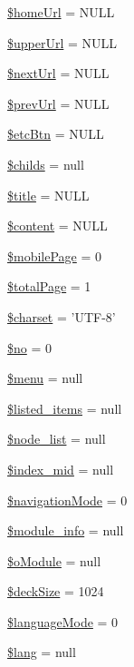 \begin{DoxyCompactItemize}
\item 
\hyperlink{classmobileXE_abff078bb36c02394447e55be4500b762}{\$home\+Url} = N\+U\+L\+L
\item 
\hyperlink{classmobileXE_a643b9ca5393066afea26819e4f1cf115}{\$upper\+Url} = N\+U\+L\+L
\item 
\hyperlink{classmobileXE_adbdb5909b975bb776f91817d2392aaca}{\$next\+Url} = N\+U\+L\+L
\item 
\hyperlink{classmobileXE_acbc08c3fe06a6a5aaae6cbdc8738559f}{\$prev\+Url} = N\+U\+L\+L
\item 
\hyperlink{classmobileXE_adac4ec3b5f46d10ac063ccba83f8ffa7}{\$etc\+Btn} = N\+U\+L\+L
\item 
\hyperlink{classmobileXE_ae641a3f98d4d95afe77f56456532aff7}{\$childs} = null
\item 
\hyperlink{classmobileXE_aeb2ef82029883fd60174e3d0e9f7dcc3}{\$title} = N\+U\+L\+L
\item 
\hyperlink{classmobileXE_a827bc8119bac862a05a1c192125bf125}{\$content} = N\+U\+L\+L
\item 
\hyperlink{classmobileXE_a4017307825d19d450c677b25b70eab5e}{\$mobile\+Page} = 0
\item 
\hyperlink{classmobileXE_a0d7bcada3689f84f67337d02c8dd6f21}{\$total\+Page} = 1
\item 
\hyperlink{classmobileXE_ae49d948fe651953a56bac2a907f6057a}{\$charset} = 'U\+T\+F-\/8'
\item 
\hyperlink{classmobileXE_a497e828014cdb6eaef56dd42d0f816e6}{\$no} = 0
\item 
\hyperlink{classmobileXE_a0ebb4296d28c9cb49fabb4d1252c1434}{\$menu} = null
\item 
\hyperlink{classmobileXE_abd07e5909154b43a31e2ebff5d51e4c7}{\$listed\+\_\+items} = null
\item 
\hyperlink{classmobileXE_af906479c52f412d0beae2252bad4ef35}{\$node\+\_\+list} = null
\item 
\hyperlink{classmobileXE_a9e93ed38eed50085338e8128ab4015ab}{\$index\+\_\+mid} = null
\item 
\hyperlink{classmobileXE_aa6e85b2d6fe4667d7d0a3a2b3f13bd12}{\$navigation\+Mode} = 0
\item 
\hyperlink{classmobileXE_a926916a0195e056ccfdaf284e56b0ea6}{\$module\+\_\+info} = null
\item 
\hyperlink{classmobileXE_a64908b5e1d46537b4739036b1a00b689}{\$o\+Module} = null
\item 
\hyperlink{classmobileXE_a3d9450dc37a10f7bb11801ab29c000ed}{\$deck\+Size} = 1024
\item 
\hyperlink{classmobileXE_a70ee01279ea1bcdd609905e80e4544b7}{\$language\+Mode} = 0
\item 
\hyperlink{classmobileXE_a126d781fe75edb57ef2718f5a6e26d82}{\$lang} = null
\end{DoxyCompactItemize}


